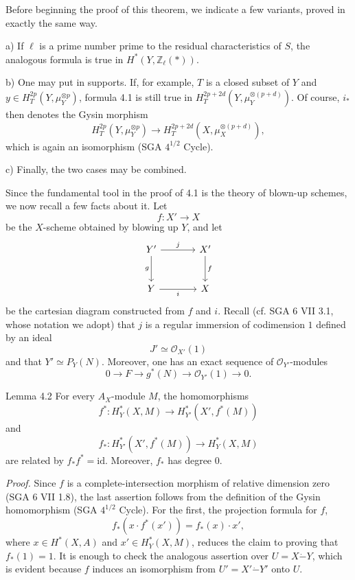 Before beginning the proof of this theorem, we indicate a few variants, proved in exactly the same way.

a) If $\ell$ is a prime number prime to the residual characteristics of $S$, the analogous formula is true in $H^*(Y,\mathbb Z_\ell(*))$.

b) One may put in supports. If, for example, $T$ is a closed subset of $Y$ and $y\in H_T^{2p}(Y,\mu_Y^{\otimes p})$, formula 4.1 is still true in $H_T^{2p+2d}(Y,\mu_Y^{\otimes(p+d)})$. Of course, $i_*$ then denotes the Gysin morphism
\[
H_T^{2p}(Y,\mu_Y^{\otimes p})
\to H_T^{2p+2d}(X,\mu_X^{\otimes(p+d)}),
\]
which is again an isomorphism (SGA $4^{1/2}$ Cycle).

c) Finally, the two cases may be combined.

Since the fundamental tool in the proof of 4.1 is the theory of blown-up schemes, we now recall a few facts about it. Let
\[
f:X'\to X
\]
be the $X$-scheme obtained by blowing up $Y$, and let
\[
\begin{tikzcd}[column sep=large,row sep=large]
Y' \arrow[r,"j"] \arrow[d,"g"'] & X' \arrow[d,"f"]\\
Y \arrow[r,"i"'] & X
\end{tikzcd}
\]
be the cartesian diagram constructed from $f$ and $i$. Recall (cf. SGA 6 VII 3.1, whose notation we adopt) that $j$ is a regular immersion of codimension $1$ defined by an ideal
\[
J'\simeq\mathcal O_{X'}(1)
\]
and that $Y'\simeq P_Y(N)$. Moreover, one has an exact sequence of $\mathcal O_{Y'}$-modules
\[
0\to F\to g^*(N)\to \mathcal O_{Y'}(1)\to0.
\]

\begin{statement}{Lemma 4.2}
For every $A_X$-module $M$, the homomorphisms
\[
f^*:H_Y^*(X,M)\to H_{Y'}^*(X',f^*(M))
\]
and
\[
f_*:H_{Y'}^*(X',f^*(M))\to H_Y^*(X,M)
\]
are related by $f_*f^*=\mathrm{id}$. Moreover, $f_*$ has degree $0$.
\end{statement}

\emph{Proof.} Since $f$ is a complete-intersection morphism of relative dimension zero (SGA 6 VII 1.8), the last assertion follows from the definition of the Gysin homomorphism (SGA $4^{1/2}$ Cycle). For the first, the projection formula for $f$,
\[
f_*(x\cdot f^*(x'))=f_*(x)\cdot x',
\]
where $x\in H^*(X,A)$ and $x'\in H_Y^*(X,M)$, reduces the claim to proving that $f_*(1)=1$. It is enough to check the analogous assertion over $U=X\mathbin{\dot{-}}Y$, which is evident because $f$ induces an isomorphism from $U'=X'\mathbin{\dot{-}}Y'$ onto $U$.

